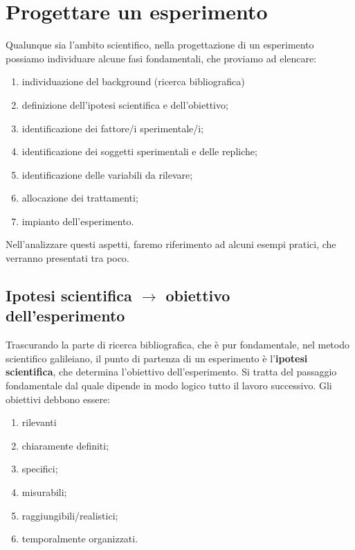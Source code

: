 \documentclass[a4paper,12pt,oneside]{book}
\providecommand{\tightlist}{%
  \setlength{\itemsep}{0pt}\setlength{\parskip}{0pt}}
\theoremstyle{definition}
\theoremstyle{definition}
\theoremstyle{definition}
\theoremstyle{remark}
\begin{document}
\chapter{Progettare un esperimento}\label{progettare-un-esperimento}

Qualunque sia l'ambito scientifico, nella progettazione di un
esperimento possiamo individuare alcune fasi fondamentali, che proviamo
ad elencare:

\begin{enumerate}
\def\labelenumi{\arabic{enumi}.}
\tightlist
\item
  individuazione del background (ricerca bibliografica)
\item
  definizione dell'ipotesi scientifica e dell'obiettivo;
\item
  identificazione dei fattore/i sperimentale/i;
\item
  identificazione dei soggetti sperimentali e delle repliche;
\item
  identificazione delle variabili da rilevare;
\item
  allocazione dei trattamenti;
\item
  impianto dell'esperimento.
\end{enumerate}

Nell'analizzare questi aspetti, faremo riferimento ad alcuni esempi
pratici, che verranno presentati tra poco.

\section{\texorpdfstring{Ipotesi scientifica \(\rightarrow\) obiettivo
dell'esperimento}{Ipotesi scientifica \textbackslash{}rightarrow obiettivo dell'esperimento}}\label{ipotesi-scientifica-rightarrow-obiettivo-dellesperimento}

Trascurando la parte di ricerca bibliografica, che è pur fondamentale,
nel metodo scientifico galileiano, il punto di partenza di un
esperimento è l'\textbf{ipotesi scientifica}, che determina l'obiettivo
dell'esperimento. Si tratta del passaggio fondamentale dal quale dipende
in modo logico tutto il lavoro successivo. Gli obiettivi debbono essere:

\begin{enumerate}
\def\labelenumi{\arabic{enumi}.}
\tightlist
\item
  rilevanti
\item
  chiaramente definiti;
\item
  specifici;
\item
  misurabili;
\item
  raggiungibili/realistici;
\item
  temporalmente organizzati.
\end{enumerate}
\end{document}
